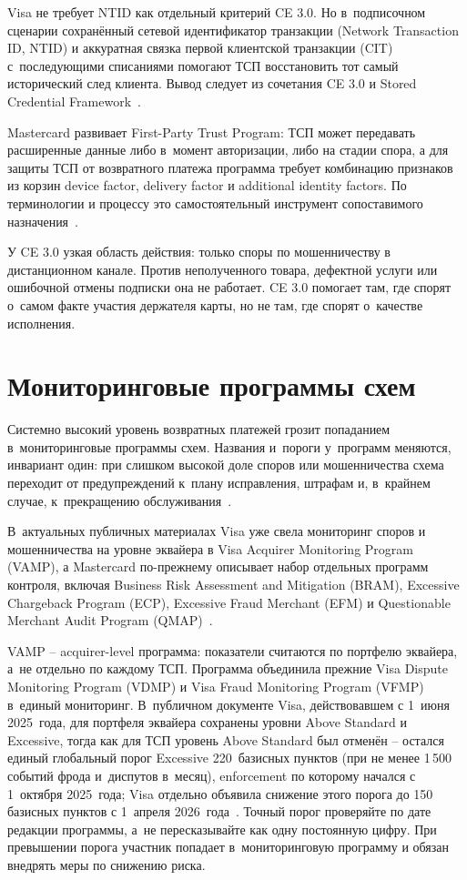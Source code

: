 Visa не требует NTID как отдельный критерий CE 3.0. Но в~подписочном
сценарии сохранённый сетевой идентификатор транзакции (Network
Transaction ID, NTID) и аккуратная связка первой клиентской транзакции
(CIT) с~последующими списаниями помогают ТСП восстановить тот самый
исторический след клиента. Вывод следует из сочетания CE 3.0
и Stored Credential Framework~\cite{visa-ce30-merchant-readiness,visa-scf}.

Mastercard развивает First-Party Trust Program: ТСП может передавать
расширенные данные либо в~момент авторизации, либо на стадии спора, а
для защиты ТСП от возвратного платежа программа требует комбинацию
признаков из корзин device factor, delivery factor и additional
identity factors. По терминологии и процессу это самостоятельный инструмент
сопоставимого назначения~\cite{mc-first-party-trust,mc-dispute-management}.

У CE 3.0 узкая область действия: только споры по мошенничеству в
дистанционном канале. Против неполученного товара, дефектной услуги
или ошибочной отмены подписки она не работает.
CE 3.0 помогает там, где спорят о~самом факте участия держателя карты,
но не там, где спорят о~качестве исполнения.

\section{Мониторинговые программы схем}\label{sec:disputes-monitoring}

Системно высокий уровень возвратных платежей грозит попаданием
в~мониторинговые программы схем. Названия и~пороги у~программ
меняются, инвариант один: при слишком высокой доле споров или
мошенничества схема переходит от предупреждений к~плану исправления,
штрафам и, в~крайнем случае, к~прекращению обслуживания~\cite{visa-core-rules,mc-chargeback-guide}.

В~актуальных публичных материалах Visa уже свела мониторинг
споров и мошенничества на уровне эквайера в Visa Acquirer
Monitoring Program (VAMP), а Mastercard по-прежнему описывает
набор отдельных программ контроля, включая Business Risk
Assessment and Mitigation (BRAM), Excessive Chargeback
Program (ECP), Excessive Fraud Merchant (EFM) и Questionable
Merchant Audit Program (QMAP)~\cite{visa-vamp-intro,mc-compliance-programs}.

VAMP -- acquirer-level программа: показатели считаются
по портфелю эквайера, а~не отдельно по каждому ТСП.
Программа объединила прежние Visa Dispute Monitoring Program
(VDMP) и Visa Fraud Monitoring Program (VFMP) в~единый
мониторинг. В~публичном документе Visa, действовавшем
с 1~июня 2025~года, для портфеля эквайера сохранены уровни
Above Standard и Excessive, тогда как для ТСП уровень
Above Standard был отменён -- остался единый глобальный
порог Excessive 220~базисных пунктов (при не менее 1\,500
событий фрода и~диспутов в~месяц), enforcement по которому
начался с 1~октября 2025~года; Visa отдельно объявила снижение
этого порога до 150 базисных пунктов с 1~апреля 2026~года~\cite{visa-vamp-fact-sheet-2025}.
Точный порог проверяйте по дате редакции
программы, а~не пересказывайте как одну постоянную цифру. При превышении
порога участник попадает в~мониторинговую программу и обязан внедрять
меры по снижению риска.

